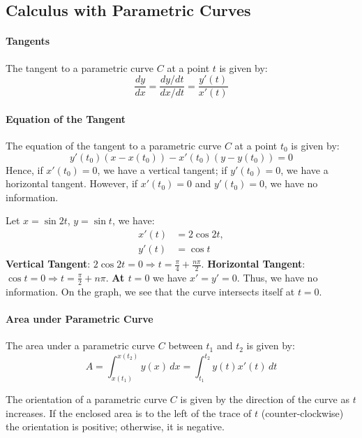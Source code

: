 \documentclass[11pt]{report}
\begin{document}
\subsection{Calculus with Parametric Curves}
\paragraph{Tangents} The tangent to a parametric curve $C$ at a point $t$ is given by:
\begin{equation}
    \frac{dy}{dx} = \frac{dy/dt}{dx/dt} = \frac{y'(t)}{x'(t)}
\end{equation}
\paragraph{Equation of the Tangent} The equation of the tangent to a parametric curve $C$ at a point $t_0$ is given by:
\begin{equation}
    y'(t_0) (x-x(t_0)) - x'(t_0) (y-y(t_0)) = 0
\end{equation}
Hence, if $x'(t_0) = 0$, we have a vertical tangent; if $y'(t_0) = 0$, we have a horizontal tangent. However, if $x'(t_0) = 0$ and $y'(t_0) = 0$, we have no information.
\begin{example}
    Let $x = \sin 2t$, $y = \sin t$, we have:
    \begin{align*}
        x'(t) &= 2\cos 2t, \\
        y'(t) &= \cos t
    \end{align*}
    \textbf{Vertical Tangent}: $2\cos 2t = 0 \Rightarrow t = \frac{\pi}{4} + \frac{n\pi}{2}$.
    \textbf{Horizontal Tangent}: $\cos t = 0 \Rightarrow t = \frac{\pi}{2} + n\pi$.
    \textbf{At $t = 0$} we have $x' = y' = 0$. Thus, we have no information. On the graph, we see that the curve intersects itself at $t = 0$.
\end{example}
\paragraph{Area under Parametric Curve} The area under a parametric curve $C$ between $t_1$ and $t_2$ is given by:
\begin{equation}
    A = \int^{x(t_2)}_{x(t_1)} y(x) \, dx = \int_{t_1}^{t_2} y(t) x'(t) \, dt 
\end{equation}
\begin{definition}[Orientation]
    The orientation of a parametric curve $C$ is given by the direction of the curve as $t$ increases. If the enclosed area is to the left of the trace of $t$ (counter-clockwise) the orientation is positive; otherwise, it is negative.
\end{definition}
\end{document}

